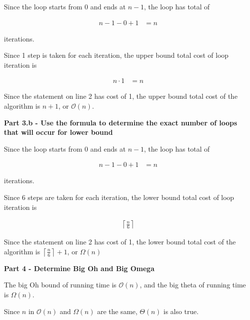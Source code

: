 \documentclass[12pt]{article}
\begin{document}
\begin{enumerate}[a.]
\begin{mdframed}
    Since the loop starts from 0 and ends at $n-1$, the loop has total of

    \begin{align}
        n-1 - 0 + 1 &= n
    \end{align}

    iterations.

    \bigskip

    Since 1 step is taken for each iteration, the upper bound total cost of loop
    iteration is

    \begin{align}
        n \cdot 1 &= n
    \end{align}

    \bigskip

    Since the statement on line 2 has cost of 1, the upper bound total cost of
    the algorithm is $n + 1$, or $\mathcal{O}(n)$.

    \bigskip

    \textbf{Part 3.b - Use the formula to determine the exact number of loops that will occur for lower bound}

    \bigskip

    Since the loop starts from 0 and ends at $n-1$, the loop has total of

    \begin{align}
        n-1 - 0 + 1 &= n
    \end{align}

    iterations.

    \bigskip

    Since 6 steps are taken for each iteration, the lower bound total cost of loop
    iteration is

    \begin{align}
        \left\lceil \frac{n}{6} \right\rceil
    \end{align}

    \bigskip

    Since the statement on line 2 has cost of 1, the lower bound total cost of
    the algorithm is $\left\lceil \frac{n}{6} \right\rceil + 1$, or $\Omega(n)$
    \color{black}

    \textbf{Part 4 - Determine Big Oh and Big Omega}

    The big Oh bound of running time is $\mathcal{O}(n)$, and the big theta of
    running time is $\Omega(n)$.

    \bigskip

    Since $n$ in $\mathcal{O}(n)$ and  $\Omega(n)$ are the same, $\Theta(n)$ is
    also true.


\end{mdframed}
\end{enumerate}
\end{document}
